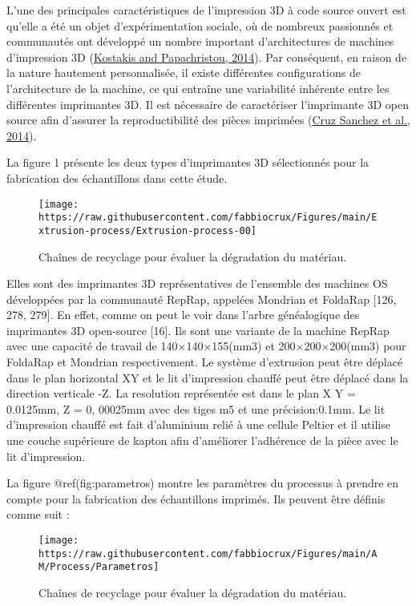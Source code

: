 \documentclass[
]{article}
\begin{document}
L'une des principales caractéristiques de l'impression 3D à code source
ouvert est qu'elle a été un objet d'expérimentation sociale, où de
nombreux passionnés et communautés ont développé un nombre important
d'architectures de machines d'impression 3D
(\protect\hyperlink{ref-Kostakis2013}{Kostakis and Papachristou, 2014}).
Par conséquent, en raison de la nature hautement personnalisée, il
existe différentes configurations de l'architecture de la machine, ce
qui entraîne une variabilité inhérente entre les différentes imprimantes
3D. Il est nécessaire de caractériser l'imprimante 3D open source afin
d'assurer la reproductibilité des pièces imprimées
(\protect\hyperlink{ref-CruzSanchez2014}{Cruz Sanchez et al., 2014}).

La figure 1 présente les deux types d'imprimantes 3D sélectionnés pour
la fabrication des échantillons dans cette étude.

\begin{figure}

{\centering \texttt{[image: https://raw.githubusercontent.com/fabbiocrux/Figures/main/Extrusion-process/Extrusion-process-00]} 

}

\caption{Chaînes de recyclage pour évaluer la dégradation du matériau.}\label{fig:foldarap}
\end{figure}

Elles sont des imprimantes 3D représentatives de l'ensemble des machines
OS développées par la communauté RepRap, appelées Mondrian et FoldaRap
{[}126, 278, 279{]}. En effet, comme on peut le voir dans l'arbre
généalogique des imprimantes 3D open-source {[}16{]}. Ils sont une
variante de la machine RepRap avec une capacité de travail de
140×140×155(mm3) et 200×200×200(mm3) pour FoldaRap et Mondrian
respectivement. Le système d'extrusion peut être déplacé dans le plan
horizontal XY et le lit d'impression chauffé peut être déplacé dans la
direction verticale -Z. La resolution représentée est dans le plan X Y =
0.0125mm, Z = 0, 00025mm avec des tiges m5 et une précision:0.1mm. Le
lit d'impression chauffé est fait d'aluminium relié à une cellule
Peltier et il utilise une couche supérieure de kapton afin d'améliorer
l'adhérence de la pièce avec le lit d'impression.

La figure @ref(fig:parametros) montre les paramètres du processus à
prendre en compte pour la fabrication des échantillons imprimés. Ils
peuvent être définis comme suit :

\begin{figure}

{\centering \texttt{[image: https://raw.githubusercontent.com/fabbiocrux/Figures/main/AM/Process/Parametros]} 

}

\caption{Chaînes de recyclage pour évaluer la dégradation du matériau.}\label{fig:parametros}
\end{figure}
\end{document}
